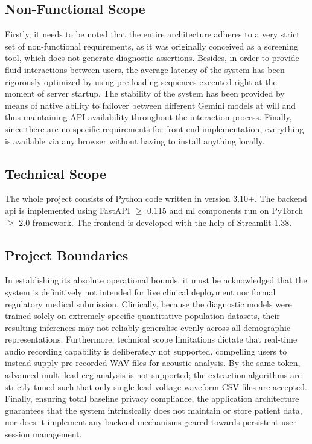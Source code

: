 \subsection{Non-Functional Scope}

Firstly, it needs to be noted that the entire architecture adheres to a very strict set of non-functional requirements, as it was originally conceived as a screening tool, which does not generate diagnostic assertions. Besides, in order to provide fluid interactions between users, the average latency of the system has been rigorously optimized by using pre-loading sequences executed right at the moment of server startup. The stability of the system has been provided by means of native ability to failover between different Gemini models at will and thus maintaining API availability throughout the interaction process. Finally, since there are no specific requirements for front end implementation, everything is available via any browser without having to install anything locally.

\subsection{Technical Scope}

The whole project consists of Python code written in version 3.10+. The backend \ac{api} is implemented using FastAPI $\geq$ 0.115 and \ac{ml} components run on PyTorch $\geq$ 2.0 framework. The frontend is developed with the help of Streamlit 1.38.
\subsection{Project Boundaries}

In establishing its absolute operational bounds, it must be acknowledged that the system is definitively not intended for live clinical deployment nor formal regulatory medical submission. Clinically, because the diagnostic models were trained solely on extremely specific quantitative population datasets, their resulting inferences may not reliably generalise evenly across all demographic representations. Furthermore, technical scope limitations dictate that real-time audio recording capability is deliberately not supported, compelling users to instead supply pre-recorded WAV files for acoustic analysis. By the same token, advanced multi-lead \ac{ecg} analysis is not supported; the extraction algorithms are strictly tuned such that only single-lead voltage waveform CSV files are accepted. Finally, ensuring total baseline privacy compliance, the application architecture guarantees that the system intrinsically does not maintain or store patient data, nor does it implement any backend mechanisms geared towards persistent user session management.

